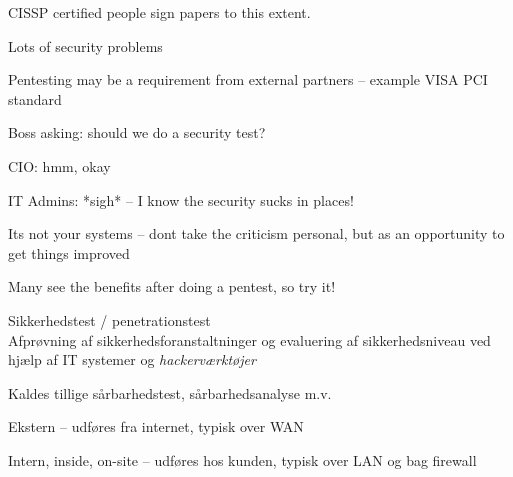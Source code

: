 \documentclass[Screen16to9,17pt]{foils}
\begin{document}


CISSP certified people sign papers to this extent.\\



\begin{list1}
\item Lots of security problems
\item Pentesting may be a requirement from external partners -- example VISA PCI standard
\end{list1}

\begin{list2}
\item Boss asking: should we do a security test?
\item CIO: hmm, okay
\item IT Admins: *sigh* -- I know the security sucks in places!
\item Its not your systems -- dont take the criticism personal, but as an opportunity to get things improved
\end{list2}

\vskip 2cm
\centerline{\Large Many see the benefits after doing a pentest, so try it!}



\begin{list1}
\item Sikkerhedstest / penetrationstest\\
Afprøvning af sikkerhedsforanstaltninger og evaluering af
sikkerhedsniveau ved hjælp af IT systemer og \emph{hackerværktøjer}
\item Kaldes tillige sårbarhedstest, sårbarhedsanalyse m.v.
\item Ekstern -- udføres fra internet, typisk over WAN
\item Intern, inside, on-site -- udføres hos kunden, typisk over LAN og
  bag firewall
\end{list1}


\end{document}
